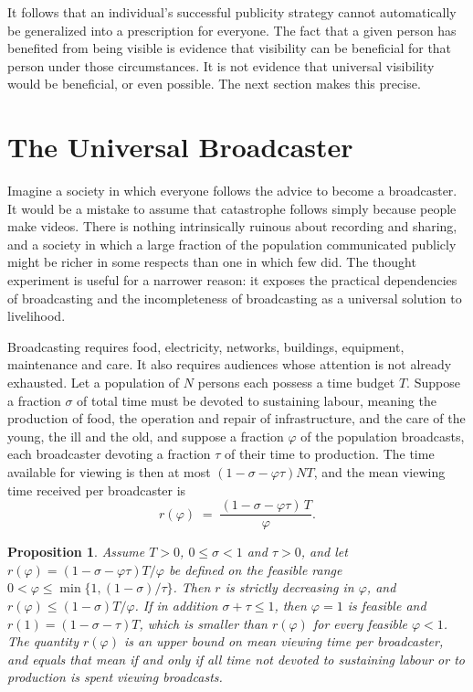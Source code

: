 \documentclass[11pt]{article}
\newtheorem{proposition}{Proposition}
\theoremstyle{definition}
\theoremstyle{remark}
\begin{document}
It follows that an individual's successful publicity strategy cannot automatically be generalized into a prescription for everyone. The fact that a given person has benefited from being visible is evidence that visibility can be beneficial for that person under those circumstances. It is not evidence that universal visibility would be beneficial, or even possible. The next section makes this precise.

\section{The Universal Broadcaster}

Imagine a society in which everyone follows the advice to become a broadcaster. It would be a mistake to assume that catastrophe follows simply because people make videos. There is nothing intrinsically ruinous about recording and sharing, and a society in which a large fraction of the population communicated publicly might be richer in some respects than one in which few did. The thought experiment is useful for a narrower reason: it exposes the practical dependencies of broadcasting and the incompleteness of broadcasting as a universal solution to livelihood.

Broadcasting requires food, electricity, networks, buildings, equipment, maintenance and care. It also requires audiences whose attention is not already exhausted. Let a population of $N$ persons each possess a time budget $T$. Suppose a fraction $\sigma$ of total time must be devoted to sustaining labour, meaning the production of food, the operation and repair of infrastructure, and the care of the young, the ill and the old, and suppose a fraction $\varphi$ of the population broadcasts, each broadcaster devoting a fraction $\tau$ of their time to production. The time available for viewing is then at most $(1 - \sigma - \varphi\tau)NT$, and the mean viewing time received per broadcaster is
\[
r(\varphi) \;=\; \frac{(1 - \sigma - \varphi\tau)\,T}{\varphi}.
\]

\begin{proposition}\label{prop:attention}
Assume $T > 0$, $0 \le \sigma < 1$ and $\tau > 0$, and let $r(\varphi) = (1-\sigma-\varphi\tau)T/\varphi$ be defined on the feasible range $0 < \varphi \le \min\{1, (1-\sigma)/\tau\}$. Then $r$ is strictly decreasing in $\varphi$, and $r(\varphi) \le (1-\sigma)T/\varphi$. If in addition $\sigma + \tau \le 1$, then $\varphi = 1$ is feasible and $r(1) = (1-\sigma-\tau)T$, which is smaller than $r(\varphi)$ for every feasible $\varphi < 1$. The quantity $r(\varphi)$ is an upper bound on mean viewing time per broadcaster, and equals that mean if and only if all time not devoted to sustaining labour or to production is spent viewing broadcasts.
\end{proposition}
\end{document}
